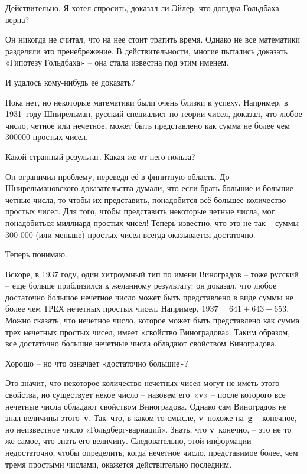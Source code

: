 \documentclass[../main.tex]{subfiles}
\begin{document}
\begin{dialogue}
 Действительно. Я хотел спросить, доказал ли Эйлер, что догадка Гольдбаха верна?

 Он никогда не считал, что на нее стоит тратить время. Однако не все математики разделяли это пренебрежение. В действительности, многие пытались доказать «Гипотезу Гольдбаха» \--- она стала известна под этим именем.

 И удалось кому-нибудь её доказать?

 Пока нет, но некоторые математики были очень близки к успеху. Например, в 1931~году Шнирельман, русский специалист по теории чисел, доказал, что любое число, четное или нечетное, может быть представлено как сумма не более чем \num{300 000} простых чисел.

 Какой странный результат. Какая же от него польза?

 Он ограничил проблему, переведя её в финитную область. До Шнирельмановского доказательства думали, что если брать большие и большие четные числа, то чтобы их представить, понадобится всё большее количество простых чисел. Для того, чтобы представить некоторые четные числа, мог понадобиться миллиард простых чисел! Теперь известно, что это не так \--- суммы 300 000 (или меньше) простых чисел всегда оказывается достаточно.

 Теперь понимаю.

 Вскоре, в 1937 году, один хитроумный тип по имени Виноградов \--- тоже русский \--- еще больше приблизился к желанному результату: он доказал, что любое достаточно большое нечетное число может быть представлено в виде суммы не более чем ТРЕХ нечетных простых чисел. Например, $1937 = 641 + 643 + 653$. Можно сказать, что нечетное число, которое может быть представлено как сумма трех нечетных простых чисел, имеет «свойство Виноградова». Таким образом, все достаточно большие нечетные числа обладают свойством Виноградова.

 Хорошо \--- но что означает «достаточно большие»?

 Это значит, что некоторое количество нечетных чисел могут не иметь этого свойства, но существует некое число \--- назовем его~«\textbf{v}» \--- после которого все нечетные числа обладают свойством Виноградова. Однако сам Виноградов не знал величины этого~\textbf{v}. Так~что, в каком-то смысле, \textbf{v}~похоже на~\textbf{g} \--- конечное, но неизвестное число «Гольдберг-вариаций». Знать, что \textbf{v}~конечно, \--- это не то же самое, что знать его величину. Следовательно, этой информации недостаточно, чтобы определить, когда нечетное число, представимое более, чем тремя простыми числами, окажется действительно последним.


\end{dialogue}
\end{document}
